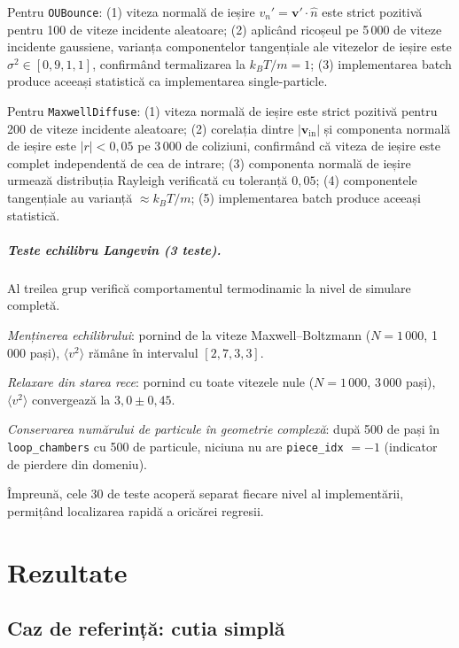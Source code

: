 \documentclass[12pt,openright,twoside]{book}
\begin{document}
Pentru \texttt{OUBounce}: (1) viteza normală de ieșire $v_n' = \mathbf{v}'\cdot\hat{n}$ este strict pozitivă pentru 100 de viteze incidente aleatoare; (2) aplicând ricoșeul pe 5\,000 de viteze incidente gaussiene, varianța componentelor tangențiale ale vitezelor de ieșire este $\sigma^2 \in [0{,}9, 1{,}1]$, confirmând termalizarea la $k_BT/m = 1$; (3) implementarea batch produce aceeași statistică ca implementarea single-particle.

Pentru \texttt{MaxwellDiffuse}: (1) viteza normală de ieșire este strict pozitivă pentru 200 de viteze incidente aleatoare; (2) corelația dintre $|\mathbf{v}_\text{in}|$ și componenta normală de ieșire este $|r| < 0{,}05$ pe 3\,000 de coliziuni, confirmând că viteza de ieșire este complet independentă de cea de intrare; (3) componenta normală de ieșire urmează distribuția Rayleigh verificată cu toleranță $0{,}05$; (4) componentele tangențiale au varianță $\approx k_BT/m$; (5) implementarea batch produce aceeași statistică.

\paragraph{Teste echilibru Langevin (3 teste).}
Al treilea grup verifică comportamentul termodinamic la nivel de simulare completă.

\emph{Menținerea echilibrului}: pornind de la viteze Maxwell--Boltzmann ($N=1\,000$, 1\,000 pași), $\langle v^2 \rangle$ rămâne în intervalul $[2{,}7, 3{,}3]$.

\emph{Relaxare din starea rece}: pornind cu toate vitezele nule ($N=1\,000$, 3\,000 pași), $\langle v^2 \rangle$ convergează la $3{,}0 \pm 0{,}45$.

\emph{Conservarea numărului de particule în geometrie complexă}: după 500 de pași în \texttt{loop\_chambers} cu 500 de particule, niciuna nu are \texttt{piece\_idx} $= -1$ (indicator de pierdere din domeniu).

Împreună, cele 30 de teste acoperă separat fiecare nivel al implementării, permițând localizarea rapidă a oricărei regresii.

\chapter{Rezultate}
\label{sec:rezultate}

\section{Caz de referință: cutia simplă}
\end{document}

